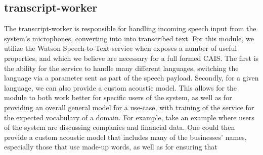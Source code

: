 \subsection{transcript-worker}

The transcript-worker is responsible for handling incoming speech input from the
system's microphones, converting into into transcribed text. For this module,
we utilize the Watson Speech-to-Text service when exposes a number of useful
properties, and which we believe are necessary for a full formed CAIS. The first
is the ability for the service to handle many different languages, switching
the language via a parameter sent as part of the speech payload. Secondly, for
a given language, we can also provide a custom acoustic model. This allows for
the module to both work better for specific users of the system, as well as for
providing an overall general model for a use-case, with training of the service
for the expected vocabulary of a domain. For example, take an example where
users of the system are discussing companies and financial data. One could then
provide a custom acoustic model that includes many of the businesses' names,
especially those that use made-up words, as well as for ensuring that 